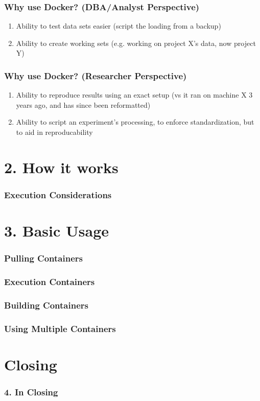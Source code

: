 \documentclass{beamer}
\begin{document}
\begin{frame}
    \frametitle{Why use Docker? (DBA/Analyst Perspective)}
    \begin{enumerate}
        \item Ability to test data sets easier (script the loading from a backup)
        \item Ability to create working sets (e.g. working on project X's data, now project Y)
    \end{enumerate}
\end{frame}

\begin{frame}
    \frametitle{Why use Docker? (Researcher Perspective)}
    \begin{enumerate}
        \item Ability to reproduce results using an exact setup (vs it ran on machine X 3 years ago, and has since been reformatted)
        \item Ability to script an experiment's processing, to enforce standardization, but to aid in reproducability
    \end{enumerate}
\end{frame}

\section{2. How it works}
\begin{frame}
    \frametitle{Execution Considerations}
\end{frame}

\section{3. Basic Usage}
\begin{frame}
    \frametitle{Pulling Containers}
\end{frame}

\begin{frame}
    \frametitle{Execution Containers}
\end{frame}

\begin{frame}
    \frametitle{Building Containers}
\end{frame}

\begin{frame}
    \frametitle{Using Multiple Containers}
\end{frame}

\section{Closing}
\begin{frame}
    \frametitle{4. In Closing}
\end{frame}
\end{document}
